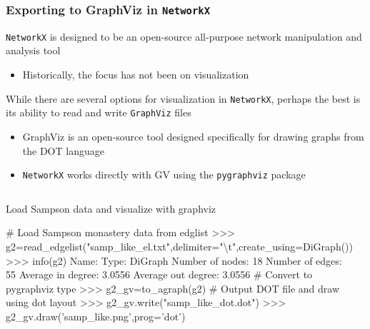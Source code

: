 \documentclass[xcolor=dvipsnames, 9pt]{beamer}
\newenvironment{code}{\begin{semiverbatim} \begin{footnotesize}}
{\end{footnotesize}\end{semiverbatim}}
\begin{document}
\begin{frame}[fragile]
    \frametitle{Exporting to GraphViz in \texttt{NetworkX}}
    \texttt{NetworkX} is designed to be an open-source all-purpose network manipulation and analysis tool
    \begin{itemize}
        \item Historically, the focus has not been on visualization
    \end{itemize}
    While there are several options for visualization in \texttt{NetworkX}, perhaps the best is its ability to read and write \texttt{GraphViz} files
    \begin{itemize}
        \item GraphViz is an open-source tool designed specifically for drawing graphs from the DOT language
        \item \texttt{NetworkX} works directly with GV using the \texttt{pygraphviz} package
    \end{itemize}
    \begin{columns}
        \begin{block}{\scriptsize{Load Sampson data and visualize with graphviz}}
            \begin{code}
\tiny{\alert<2>{# Load Sampson monastery data from edglist}
>>> g2=read_edgelist("samp_like_el.txt",delimiter="\textbackslash t",create_using=DiGraph())
>>> info(g2)
Name:                  
Type:                  DiGraph
Number of nodes:       18
Number of edges:       55
Average in degree:     3.0556
Average out degree:    3.0556
\alert<3>{# Convert to pygraphviz type}
>>> g2_gv=to_agraph(g2)
\alert<4>{# Output DOT file and draw using dot layout}
>>> g2_gv.write("samp_like_dot.dot")
>>> g2_gv.draw('samp_like.png',prog='dot')}
            \end{code}
        \end{block}
        \begin{center}
        \end{center}
    \end{columns}
\end{frame}
\end{document}
